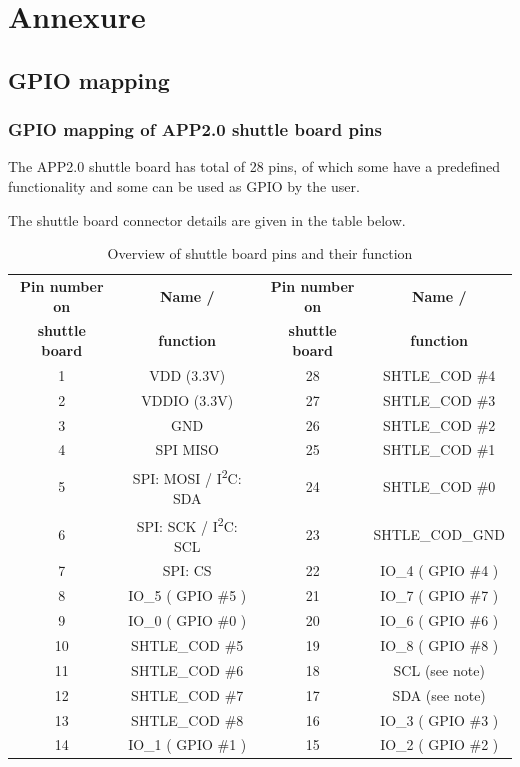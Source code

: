 \documentclass{article}
\begin{document}
\section{Annexure}
\subsection{GPIO mapping}

\subsubsection{GPIO mapping of APP2.0 shuttle board pins}

The APP2.0 shuttle board has total of 28 pins, of which some have a predefined functionality and some can be used as GPIO by the user.

The shuttle board connector details are given in the table below.

\begin{table}[H]
	\centering
	\begin{tabular}{|c|c|c|c|}
		\hline
		\textbf{Pin number on} & \textbf{Name /} & \textbf{Pin number on} & \textbf{Name /} \\
		\textbf{shuttle board} & \textbf{function} & \textbf{shuttle board} & \textbf{function} \\
		\hline\hline
		1 & VDD (3.3V) & 28 & SHTLE\_COD \#4 \\ \hline
		2 & VDDIO (3.3V) & 27 & SHTLE\_COD \#3 \\ \hline
		3 & GND & 26 & SHTLE\_COD \#2 \\ \hline
		4 & SPI MISO & 25 & SHTLE\_COD \#1 \\ \hline
		5 & SPI: MOSI / I\textsuperscript{2}C: SDA & 24 & SHTLE\_COD \#0 \\ \hline
		6 & SPI: SCK / I\textsuperscript{2}C: SCL & 23 & SHTLE\_COD\_GND \\ \hline
		7 & SPI: CS & 22 & IO\_4 ( GPIO \#4 ) \\ \hline
		8 & IO\_5 ( GPIO \#5 ) & 21 & IO\_7 ( GPIO \#7 ) \\ \hline
		9 & IO\_0 ( GPIO \#0 ) & 20 & IO\_6 ( GPIO \#6 ) \\ \hline 
		10 & SHTLE\_COD \#5 & 19 & IO\_8 ( GPIO \#8 ) \\ \hline 
		11 & SHTLE\_COD \#6 & 18 & SCL (see note) \\ \hline 
		12 & SHTLE\_COD \#7 & 17 & SDA (see note)\\ \hline 
		13 & SHTLE\_COD \#8 & 16 & IO\_3 ( GPIO \#3 ) \\ \hline
		14 & IO\_1 ( GPIO \#1 ) & 15 & IO\_2 ( GPIO \#2 ) \\ \hline
	\end{tabular}
	\caption{Overview of shuttle board pins and their function}
	\label{tab:shtbrdpins}
\end{table}
\end{document}
